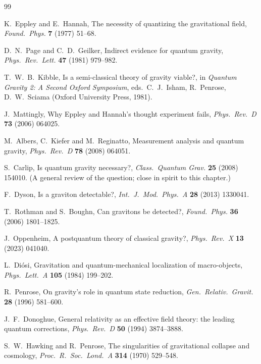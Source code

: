 \begin{thebibliography}{99}

 K.~Eppley and E.~Hannah, The necessity of quantizing
  the gravitational field, \emph{Found.\ Phys.} \textbf{7} (1977) 51--68.

 D.~N.~Page and C.~D.~Geilker, Indirect evidence for
  quantum gravity, \emph{Phys.\ Rev.\ Lett.} \textbf{47} (1981) 979--982.

 T.~W.~B.~Kibble, Is a semi-classical theory of
  gravity viable?, in \emph{Quantum Gravity 2: A Second Oxford Symposium},
  eds.\ C.~J.~Isham, R.~Penrose, D.~W.~Sciama (Oxford University Press,
  1981).

 J.~Mattingly, Why Eppley and Hannah's thought
  experiment fails, \emph{Phys.\ Rev.\ D} \textbf{73} (2006) 064025.

 M.~Albers, C.~Kiefer and M.~Reginatto, Measurement
  analysis and quantum gravity, \emph{Phys.\ Rev.\ D} \textbf{78} (2008)
  064051.

 S.~Carlip, Is quantum gravity necessary?,
  \emph{Class.\ Quantum Grav.} \textbf{25} (2008) 154010. (A general
  review of the question; close in spirit to this chapter.)

 F.~Dyson, Is a graviton detectable?,
  \emph{Int.\ J.\ Mod.\ Phys.\ A} \textbf{28} (2013) 1330041.

 T.~Rothman and S.~Boughn, Can gravitons be detected?,
  \emph{Found.\ Phys.} \textbf{36} (2006) 1801--1825.

 J.~Oppenheim, A postquantum theory of classical
  gravity?, \emph{Phys.\ Rev.\ X} \textbf{13} (2023) 041040.

 L.~Di\'osi, Gravitation and quantum-mechanical
  localization of macro-objects, \emph{Phys.\ Lett.\ A} \textbf{105}
  (1984) 199--202.

 R.~Penrose, On gravity's role in quantum state
  reduction, \emph{Gen.\ Relativ.\ Gravit.} \textbf{28} (1996) 581--600.

 J.~F.~Donoghue, General relativity as an effective
  field theory: the leading quantum corrections, \emph{Phys.\ Rev.\ D}
  \textbf{50} (1994) 3874--3888.

 S.~W.~Hawking and R.~Penrose, The
  singularities of gravitational collapse and cosmology, \emph{Proc.\ R.\
  Soc.\ Lond.\ A} \textbf{314} (1970) 529--548.


\end{thebibliography}
